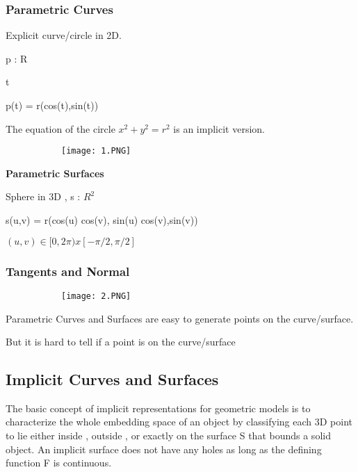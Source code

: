 \documentclass{article}
\begin{document}
\vspace{30mm}

\subsubsection{Parametric Curves}

Explicit curve/circle in 2D.

p : R 

t 

p(t) = r(cos(t),sin(t))

The equation of the circle $x^2 + y^2 = r^2$ is an implicit version.

\begin{figure}[ht!]
  \centering
  \begin{subfigure}[b]{0.3\linewidth}
    \texttt{[image: 1.PNG]}
  \end{subfigure}
\end{figure}

\textbf{Parametric Surfaces }

Sphere in 3D ,  s : $R^2$ 

s(u,v) = r(cos(u) cos(v), sin(u) cos(v),sin(v))

$(u,v) \in [0,2\pi) x [-\pi / 2 , \pi/ 2]$



\subsubsection{Tangents and Normal}

\begin{figure}[ht!]
  \centering
  \begin{subfigure}[b]{0.8\linewidth}
    \texttt{[image: 2.PNG]}
  \end{subfigure}
\end{figure}

Parametric Curves and Surfaces are easy to generate points on the curve/surface. 

But it is hard to tell if a point is on the curve/surface

\vspace{20mm}

\subsection{Implicit Curves and Surfaces}

The basic concept of implicit representations for geometric models is to characterize the whole embedding space of an object by classifying each 3D point to lie either inside , outside , or exactly on the surface S that bounds a solid object.
An implicit surface does not have any holes as long as the defining function F is continuous.
\end{document}
